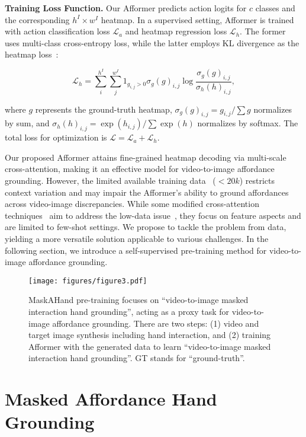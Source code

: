 \documentclass[10pt,twocolumn,letterpaper]{article}
\begin{document}
\noindent\textbf{Training Loss Function.} Our Afformer predicts action logits for $c$ classes and the corresponding $h^I \times w^I$ heatmap. In a supervised setting, Afformer is trained with action classification loss $\mathcal{L}_a$ and heatmap regression loss $\mathcal{L}_h$. The former uses multi-class cross-entropy loss, while the latter employs KL divergence as the heatmap loss~\cite{demo2vec,saliency_loss}:

\begin{equation}
    \mathcal{L}_{h} = \sum_i^{h^I}\sum_j^{w^I} 1_{g_{i,j}>0} \sigma_{g}(g)_{i,j}\log\frac{\sigma_g(g)_{i,j}}{\sigma_{h}(h)_{i,j}},  \label{equation11}
\end{equation}

\noindent where $g$ represents the ground-truth heatmap, $\sigma_g(g)_{i,j} = g_{i,j} / \sum g$ normalizes by sum, and $\sigma_h(h)_{i,j} = \exp(h_{i,j}) / \sum \exp(h)$ normalizes by softmax. The total loss for optimization is $\mathcal{L} = \mathcal{L}_{a} + \mathcal{L}_{h}$.

Our proposed Afformer attains fine-grained heatmap decoding via multi-scale cross-attention, making it an effective model for video-to-image affordance grounding. However, the limited available training data~\cite{demo2vec,hotspot,assistq} ($<20k$) restricts context variation and may impair the Afformer's ability to ground affordances across video-image discrepancies. While some modified cross-attention techniques~\cite{crossattn_fewshot,cat} aim to address the low-data issue~\cite{crossattn_fewshot}, they focus on feature aspects and are limited to few-shot settings. We propose to tackle the problem from data, yielding a more versatile solution applicable to various challenges. In the following section, we introduce a self-supervised pre-training method for video-to-image affordance grounding.

\begin{figure*}[t]
    \centering
    \texttt{[image: figures/figure3.pdf]}
    \caption{MaskAHand pre-training focuses on ``video-to-image masked interaction hand grounding'', acting as a proxy task for video-to-image affordance grounding. There are two steps: (1) video and target image synthesis including hand interaction, and (2) training Afformer with the generated data to learn ``video-to-image masked interaction hand grounding''. GT stands for ``ground-truth''.}
    \label{figure3}
\end{figure*}

\section{Masked Affordance Hand Grounding}
\end{document}
